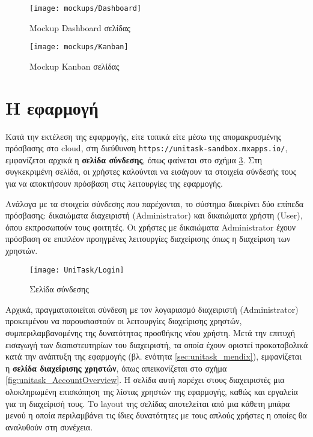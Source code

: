         \begin{figure}[p!] \noindent \centering
            \texttt{[image: mockups/Dashboard]}
            \caption{\centering Mockup Dashboard σελίδας}
            \label{fig:unitaskMockupDashboard}
        \end{figure}

        \begin{figure}[p!] \noindent \centering
            \texttt{[image: mockups/Kanban]}
            \caption{\centering Mockup Kanban σελίδας}
            \label{fig:unitaskMockupKanban}
        \end{figure}

    \pagebreak

    \section{Η εφαρμογή}
        Κατά την εκτέλεση της εφαρμογής, είτε τοπικά είτε μέσω της απομακρυσμένης πρόσβασης στο cloud, στη διεύθυνση \texttt{https://unitask-sandbox.mxapps.io/}, εμφανίζεται αρχικά η \textbf{σελίδα σύνδεσης}, όπως φαίνεται στο σχήμα \ref{fig:unitask_Login}. Στη συγκεκριμένη σελίδα, οι χρήστες καλούνται να εισάγουν τα στοιχεία σύνδεσής τους για να αποκτήσουν πρόσβαση στις λειτουργίες της εφαρμογής.

        Ανάλογα με τα στοιχεία σύνδεσης που παρέχονται, το σύστημα διακρίνει δύο επίπεδα πρόσβασης: δικαιώματα διαχειριστή (Administrator) και δικαιώματα χρήστη (User), όπου εκπροσωπούν τους φοιτητές. Οι χρήστες με δικαιώματα Administrator έχουν πρόσβαση σε επιπλέον προηγμένες λειτουργίες διαχείρισης όπως η διαχείριση των χρηστών.

       \begin{figure}[h!] \noindent \centering
            \texttt{[image: UniTask/Login]}
            \caption{\centering Σελίδα σύνδεσης}
            \label{fig:unitask_Login}
        \end{figure}

        Αρχικά, πραγματοποιείται σύνδεση με τον λογαριασμό διαχειριστή (Administrator) προκειμένου να παρουσιαστούν οι λειτουργίες διαχείρισης χρηστών, συμπεριλαμβανομένης της δυνατότητας προσθήκης νέου χρήστη. Μετά την επιτυχή εισαγωγή των διαπιστευτηρίων του διαχειριστή, τα οποία έχουν οριστεί προκαταβολικά κατά την ανάπτυξη της εφαρμογής (βλ. ενότητα \ref{sec:unitask_mendix}), εμφανίζεται η \textbf{σελίδα διαχείρισης χρηστών}, όπως απεικονίζεται στο σχήμα \ref{fig:unitask_AccountOverview}. Η σελίδα αυτή παρέχει στους διαχειριστές μια ολοκληρωμένη επισκόπηση της λίστας χρηστών της εφαρμογής, καθώς και εργαλεία για τη διαχείρισή τους. Το layout της σελίδας αποτελείται από μια κάθετη μπάρα μενού η οποία περιλαμβάνει τις ίδιες δυνατότητες με τους απλούς χρήστες η οποίες θα αναλυθούν στη συνέχεια.


